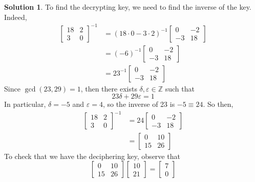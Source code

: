 \documentclass[11pt]{article}
\theoremstyle{definition}\newtheorem{definition}{Definition}
\theoremstyle{definition}\newtheorem{question}{Question}
\theoremstyle{definition}\newtheorem*{solution}{Solution}
\theoremstyle{definition}\newtheorem{example}{Example}
\theoremstyle{definition}\newtheorem{notation}{Notation}
\theoremstyle{theorem}\newtheorem{theorem}{Theorem}
\theoremstyle{theorem}\newtheorem{corollary}{Corollary}
\theoremstyle{theorem}\newtheorem{lemma}{Lemma}
\theoremstyle{theorem}\newtheorem{proposition}{Proposition}
\renewcommand{\d}{\delta}
\newcommand{\e}{\varepsilon}
\newcommand{\Z}{\mathbb{Z}}
\begin{document}
\begin{solution}
    To find the decrypting key, we need to find the inverse of the key. Indeed,
    \begin{align*}
        \begin{bmatrix} 18 & 2 \\ 3 & 0 \end{bmatrix}^{-1} &= (18 \cdot 0 - 3 \cdot 2)^{-1} \begin{bmatrix} 0 & -2 \\ -3 & 18 \end{bmatrix} \\
        &= (-6)^{-1} \begin{bmatrix} 0 & -2 \\ -3 & 18 \end{bmatrix} \\
        &= 23^{-1} \begin{bmatrix} 0 & -2 \\ -3 & 18 \end{bmatrix}
    \end{align*}
    Since $\gcd(23, 29) = 1$, then there exists $\d, \e \in \Z$ such that
    \begin{equation*}
        23\d + 29\e = 1
    \end{equation*}
    In particular, $\d = -5$ and $\e = 4$, so the inverse of 23 is $-5 \equiv 24$. So then,
    \begin{align*}
        \begin{bmatrix} 18 & 2 \\ 3 & 0 \end{bmatrix}^{-1} &= 24 \begin{bmatrix} 0 & -2 \\ -3 & 18 \end{bmatrix} \\
        &= \begin{bmatrix} 0 & 10 \\ 15 & 26 \end{bmatrix}
    \end{align*}
    To check that we have the deciphering key, observe that
    \begin{equation*}
        \begin{bmatrix} 0 & 10 \\ 15 & 26 \end{bmatrix}\begin{bmatrix} 10 \\ 21 \end{bmatrix} = \begin{bmatrix} 7 \\ 0 \end{bmatrix}

\end{equation*}
\end{solution}
\end{document}
